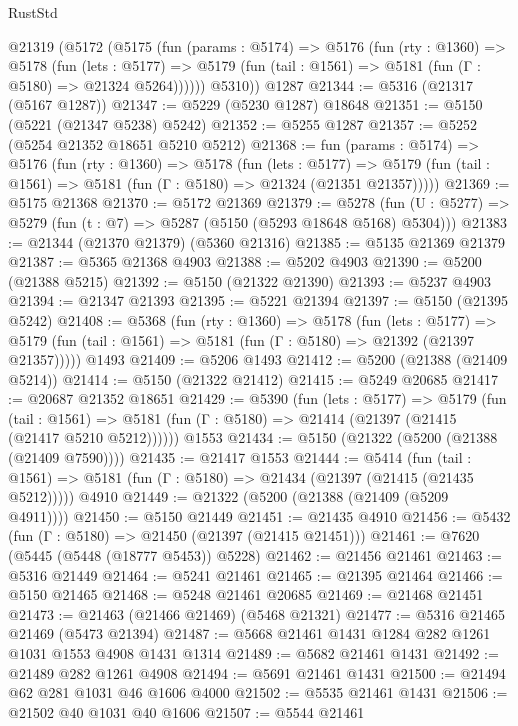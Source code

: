 \begin{lexlean}{RustStd}
\begin{coremodule}
    @21319
      (@5172
        (@5175
          (fun (params : @5174) =>
          @5176
            (fun (rty : @1360) =>
            @5178
              (fun (lets : @5177) =>
              @5179 (fun (tail : @1561) => @5181 (fun (Γ : @5180) => @21324 @5264))))))
        @5310))
    @1287
@21344 := @5316 (@21317 (@5167 @1287))
@21347 := @5229 (@5230 @1287) @18648
@21351 := @5150 (@5221 (@21347 @5238) @5242)
@21352 := @5255 @1287
@21357 := @5252 (@5254 @21352 @18651 @5210 @5212)
@21368 := fun (params : @5174) =>
  @5176
    (fun (rty : @1360) =>
    @5178
      (fun (lets : @5177) =>
      @5179 (fun (tail : @1561) => @5181 (fun (Γ : @5180) => @21324 (@21351 @21357)))))
@21369 := @5175 @21368
@21370 := @5172 @21369
@21379 := @5278
    (fun (U : @5277) => @5279 (fun (t : @7) => @5287 (@5150 (@5293 @18648 @5168) @5304)))
@21383 := @21344 (@21370 @21379) (@5360 @21316)
@21385 := @5135 @21369 @21379
@21387 := @5365 @21368 @4903
@21388 := @5202 @4903
@21390 := @5200 (@21388 @5215)
@21392 := @5150 (@21322 @21390)
@21393 := @5237 @4903
@21394 := @21347 @21393
@21395 := @5221 @21394
@21397 := @5150 (@21395 @5242)
@21408 := @5368
    (fun (rty : @1360) =>
    @5178
      (fun (lets : @5177) =>
      @5179 (fun (tail : @1561) => @5181 (fun (Γ : @5180) => @21392 (@21397 @21357)))))
    @1493
@21409 := @5206 @1493
@21412 := @5200 (@21388 (@21409 @5214))
@21414 := @5150 (@21322 @21412)
@21415 := @5249 @20685
@21417 := @20687 @21352 @18651
@21429 := @5390
    (fun (lets : @5177) =>
    @5179
      (fun (tail : @1561) =>
      @5181 (fun (Γ : @5180) => @21414 (@21397 (@21415 (@21417 @5210 @5212))))))
    @1553
@21434 := @5150 (@21322 (@5200 (@21388 (@21409 @7590))))
@21435 := @21417 @1553
@21444 := @5414
    (fun (tail : @1561) => @5181 (fun (Γ : @5180) => @21434 (@21397 (@21415 (@21435 @5212)))))
    @4910
@21449 := @21322 (@5200 (@21388 (@21409 (@5209 @4911))))
@21450 := @5150 @21449
@21451 := @21435 @4910
@21456 := @5432 (fun (Γ : @5180) => @21450 (@21397 (@21415 @21451)))
@21461 := @7620 (@5445 (@5448 (@18777 @5453)) @5228)
@21462 := @21456 @21461
@21463 := @5316 @21449
@21464 := @5241 @21461
@21465 := @21395 @21464
@21466 := @5150 @21465
@21468 := @5248 @21461 @20685
@21469 := @21468 @21451
@21473 := @21463 (@21466 @21469) (@5468 @21321)
@21477 := @5316 @21465 @21469 (@5473 @21394)
@21487 := @5668 @21461 @1431 @1284 @282 @1261 @1031 @1553 @4908 @1431 @1314
@21489 := @5682 @21461 @1431
@21492 := @21489 @282 @1261 @4908
@21494 := @5691 @21461 @1431
@21500 := @21494 @62 @281 @1031 @46 @1606 @4000
@21502 := @5535 @21461 @1431
@21506 := @21502 @40 @1031 @40 @1606
@21507 := @5544 @21461

\end{coremodule}
\end{lexlean}
